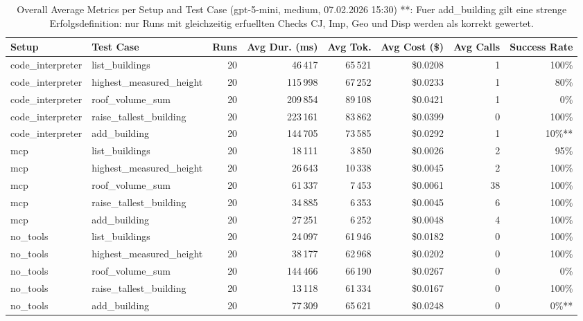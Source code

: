 \documentclass[a4paper,11pt]{article}
\begin{document}
\begin{table}[H]
\centering
\scriptsize
\caption{Overall Average Metrics per Setup and Test Case (gpt-5-mini, medium, 07.02.2026 15:30) **: Fuer add\_building gilt eine strenge Erfolgsdefinition: nur Runs mit gleichzeitig erfuellten Checks CJ, Imp, Geo und Disp werden als korrekt gewertet.}
\begin{tabular}{l l r r r r r r}
\toprule
Setup & Test Case & Runs & Avg Dur. (ms) & Avg Tok. & Avg Cost (\$) & Avg Calls & Success Rate \\
\midrule
code\_interpreter & list\_buildings & 20 & 46\,417 & 65\,521 & \$0.0208 & 1 & 100\% \\
code\_interpreter & highest\_measured\_height & 20 & 115\,998 & 67\,252 & \$0.0233 & 1 & 80\% \\
code\_interpreter & roof\_volume\_sum & 20 & 209\,854 & 89\,108 & \$0.0421 & 1 & 0\% \\
code\_interpreter & raise\_tallest\_building & 20 & 223\,161 & 83\,862 & \$0.0399 & 0 & 100\% \\
code\_interpreter & add\_building & 20 & 144\,705 & 73\,585 & \$0.0292 & 1 & 10\%** \\
\midrule
mcp & list\_buildings & 20 & 18\,111 & 3\,850 & \$0.0026 & 2 & 95\% \\
mcp & highest\_measured\_height & 20 & 26\,643 & 10\,338 & \$0.0045 & 2 & 100\% \\
mcp & roof\_volume\_sum & 20 & 61\,337 & 7\,453 & \$0.0061 & 38 & 100\% \\
mcp & raise\_tallest\_building & 20 & 34\,885 & 6\,353 & \$0.0045 & 6 & 100\% \\
mcp & add\_building & 20 & 27\,251 & 6\,252 & \$0.0048 & 4 & 100\% \\
\midrule
no\_tools & list\_buildings & 20 & 24\,097 & 61\,946 & \$0.0182 & 0 & 100\% \\
no\_tools & highest\_measured\_height & 20 & 38\,177 & 62\,968 & \$0.0202 & 0 & 100\% \\
no\_tools & roof\_volume\_sum & 20 & 144\,466 & 66\,190 & \$0.0267 & 0 & 0\% \\
no\_tools & raise\_tallest\_building & 20 & 13\,118 & 61\,334 & \$0.0167 & 0 & 100\% \\
no\_tools & add\_building & 20 & 77\,309 & 65\,621 & \$0.0248 & 0 & 0\%** \\
\bottomrule
\end{tabular}
\end{table}

\clearpage
\end{document}
